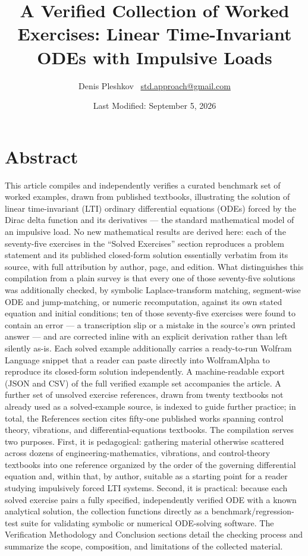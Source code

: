 \documentclass[
  11pt,
]{article}
\title{A Verified Collection of Worked Exercises: Linear Time-Invariant ODEs with Impulsive Loads}
\author{Denis Pleshkov
~\href{mailto:std.approach@gmail.com}{std.approach@gmail.com}}
\date{Last Modified: September 5, 2026}
\begin{document}
\maketitle

\hypertarget{abstract}{%
\section{Abstract}\label{abstract}}

This article compiles and independently verifies a curated benchmark set
of worked examples, drawn from published textbooks, illustrating the
solution of linear time-invariant (LTI) ordinary differential equations
(ODEs) forced by the Dirac delta function and its derivatives --- the
standard mathematical model of an impulsive load. No new mathematical
results are derived here: each of the seventy-five exercises in the
``Solved Exercises'' section reproduces a problem statement and its
published closed-form solution essentially verbatim from its source,
with full attribution by author, page, and edition. What distinguishes
this compilation from a plain survey is that every one of those
seventy-five solutions was additionally checked, by symbolic
Laplace-transform matching, segment-wise ODE and jump-matching, or
numeric recomputation, against its own stated equation and initial
conditions; ten of those seventy-five exercises were found to contain an
error --- a transcription slip or a mistake in the source's own printed
answer --- and are corrected inline with an explicit derivation rather
than left silently as-is. Each solved example additionally carries a
ready-to-run Wolfram Language snippet that a reader can paste directly
into WolframAlpha to reproduce its closed-form solution independently. A
machine-readable export (JSON and CSV) of the full verified example set
accompanies the article. A further set of unsolved exercise references,
drawn from twenty textbooks not already used as a solved-example source,
is indexed to guide further practice; in total, the References section
cites fifty-one published works spanning control theory, vibrations, and
differential-equations textbooks. The compilation serves two purposes.
First, it is pedagogical: gathering material otherwise scattered across
dozens of engineering-mathematics, vibrations, and control-theory
textbooks into one reference organized by the order of the governing
differential equation and, within that, by author, suitable as a
starting point for a reader studying impulsively forced LTI systems.
Second, it is practical: because each solved exercise pairs a fully
specified, independently verified ODE with a known analytical solution,
the collection functions directly as a benchmark/regression-test suite
for validating symbolic or numerical ODE-solving software. The
Verification Methodology and Conclusion sections detail the checking
process and summarize the scope, composition, and limitations of the
collected material.
\end{document}

